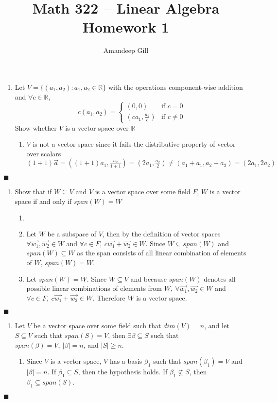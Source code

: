 \documentclass[a4paper, 12pt]{report}
\newcommand{\bb}[1]{\mathbb{#1}}
\newcommand{\proof}[3]{
	\begin{enumerate}
		\item[\bf{Problem #1}] #2
		\begin{enumerate}
			\item[\bf{Proof:}]
			#3
		\end{enumerate}
	\end{enumerate}
	\begin{flushright}
		$\blacksquare$
	\end{flushright}
}
\begin{document}
\title{Math 322 -- Linear Algebra \\ \vspace{7px} \large{Homework 1}}
\author{Amandeep Gill}
\maketitle

\proof{1}{
	Let $V = \{(a_1,a_2) : a_1,a_2 \in \bb{R}\}$ with the operations component-wise addition and 
	$ \forall c \in \bb{R} ,$
	\[ c (a_1,a_2) = 
		\left\{
		\begin{array}{ll}
			(0,0) & \text{if } c = 0 \\
			(c a_1, \frac{a_2}{c}) & \text{if } c \ne 0
		\end{array}
		\right.
	\]
	Show whether $V$ is a vector space over $\bb{R}$
}{
	$V$ is not a vector space since it fails the distributive property of vector over scalars \\
	$(1 + 1)\vec{a} = ((1 + 1)a_1, \frac{a_2}{1 + 1}) = (2a_1,\frac{a_2}{2}) \ne (a_1 + a_1,a_2 + a_2) = (2a_1,2a_2)$
}

\proof{2}{
	Show that if $W \subseteq V$ and $V$ is a vector space over some field $F$, $W$ is a vector space if and only if $span(W) = W$
}{
	\item[$(\Rightarrow)$] 
		Let $W$ be a subspace of $V$, then by the definition of vector spaces $\forall \vec{w_1}, \vec{w_2} \in W$ and $\forall c \in F,\ c \vec{w_1} + \vec{w_2} \in W$. Since $W \subseteq span(W)$ and $span(W) \subseteq W$ as the span consists of all linear combination of elements of $W$, $span(W) = W$. \\
	\item[$(\Leftarrow)$]
		Let $span(W) = W$. Since $W \subseteq V$ and because $span(W)$ denotes all possible linear combinations of elements from $W,\ \forall \vec{w_1}, \vec{w_2} \in W$ and $\forall c \in F,\ c \vec{w_1} + \vec{w_2} \in W$. Therefore $W$ is a vector space.
}

\proof{3}{
	Let $V$ be a vector space over some field such that $dim(V) = n$, and let $S \subseteq V$ such that $span(S) = V$, then $\exists \beta \subseteq S$ such that $span(\beta) = V,\ |\beta| = n$, and $|S| \geqslant n$.
}{
	Since $V$ is a vector space, $V$ has a basis $\beta_1$ such that $span(\beta_1) = V$ and $|\beta| = n$. If $\beta_1 \subseteq S$, then the hypothesis holds. If $\beta_1 \not\subseteq S$, then $\beta_1 \subseteq span(S)$.
}
\end{document}
